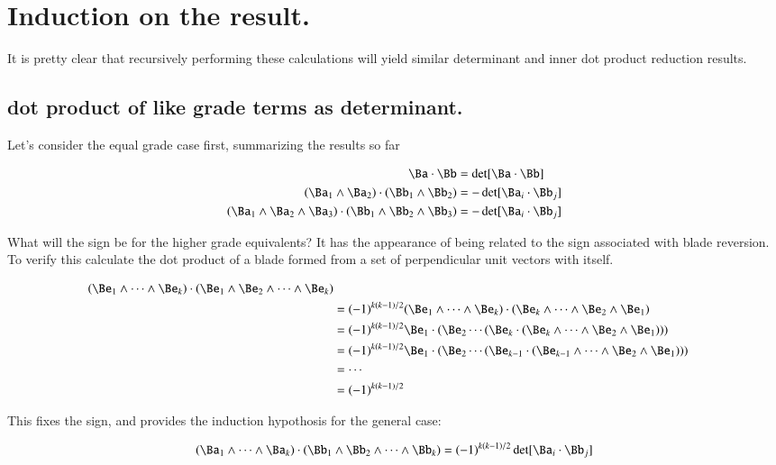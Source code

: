 \section{Induction on the result. }

It is pretty clear that recursively performing these calculations will yield similar determinant and inner dot product reduction
results.

\subsection{dot product of like grade terms as determinant. }

Let's consider the equal grade case first, summarizing the results so far

\begin{align*}
\Ba \cdot \Bb &= \det[\Ba \cdot \Bb] \\
(\Ba_1 \wedge \Ba_2) \cdot (\Bb_1 \wedge \Bb_2) &= -\det[\Ba_i \cdot \Bb_j] \\
(\Ba_1 \wedge \Ba_2 \wedge \Ba_3) \cdot (\Bb_1 \wedge \Bb_2 \wedge \Bb_3) &= -\det[\Ba_i \cdot \Bb_j] \\
\end{align*}

What will the sign be for the higher grade equivalents?  It has the appearance of being related to the sign associated with blade
reversion.  To verify this calculate the dot product of a blade formed from a set of perpendicular unit vectors with itself.

\begin{align*}
(\Be_1 \wedge \cdots \wedge \Be_k) \cdot (\Be_1 \wedge \Be_2 \wedge \cdots \wedge \Be_k) \\
&= (-1)^{k(k-1)/2}(\Be_1 \wedge \cdots \wedge \Be_k) \cdot (\Be_k \wedge \cdots \wedge \Be_2 \wedge \Be_1) \\
&= (-1)^{k(k-1)/2}\Be_1 \cdot (\Be_2 \cdots (\Be_k \cdot (\Be_k \wedge \cdots \wedge \Be_2 \wedge \Be_1))) \\
&= (-1)^{k(k-1)/2}\Be_1 \cdot (\Be_2 \cdots (\Be_{k-1} \cdot (\Be_{k-1} \wedge \cdots \wedge \Be_2 \wedge \Be_1))) \\
&= \cdots \\
&= (-1)^{k(k-1)/2}
\end{align*}

This fixes the sign, and provides the induction hypothosis for the general case:

\begin{equation}\label{eqn:bladegradereduction:bladedothyp}
(\Ba_1 \wedge \cdots \wedge \Ba_k) \cdot (\Bb_1 \wedge \Bb_2 \wedge \cdots \wedge \Bb_k) = (-1)^{k(k-1)/2}\det[\Ba_i \cdot \Bb_j]
\end{equation}


